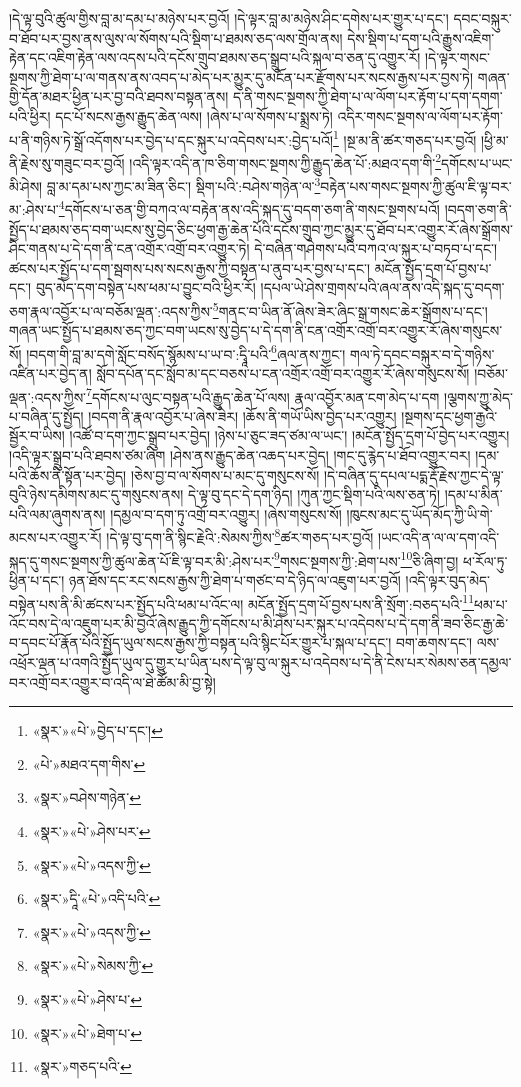 །དེ་ལྟ་བུའི་ཚུལ་གྱིས་བླ་མ་དམ་པ་མཉེས་པར་བྱའོ། །དེ་ལྟར་བླ་མ་མཉེས་ཤིང་དགེས་པར་གྱུར་པ་དང་། དབང་བསྐུར་བ་ཐོབ་པར་བྱས་ནས་ལུས་ལ་སོགས་པའི་སྡིག་པ་ཐམས་ཅད་ལས་གྲོལ་ནས། དེས་སྡིག་པ་དག་པའི་རྒྱུས་འཇིག་རྟེན་དང་འཇིག་རྟེན་ལས་འདས་པའི་དངོས་གྲུབ་ཐམས་ཅད་སྒྲུབ་པའི་སྐལ་བ་ཅན་དུ་འགྱུར་རོ། །དེ་ལྟར་གསང་སྔགས་ཀྱི་ཐེག་པ་ལ་གནས་ནས་འབད་པ་མེད་པར་མྱུར་དུ་མངོན་པར་རྫོགས་པར་སངས་རྒྱས་པར་བྱས་ཏེ། གཞན་གྱི་དོན་མཐར་ཕྱིན་པར་བྱ་བའི་ཐབས་བསྟན་ནས། ད་ནི་གསང་སྔགས་ཀྱི་ཐེག་པ་ལ་ལོག་པར་རྟོག་པ་དག་དགག་པའི་ཕྱིར། དང་པོ་སངས་རྒྱས་རྒྱུད་ཆེན་ལས། །ཞེས་པ་ལ་སོགས་པ་སྨྲས་ཏེ། འདིར་གསང་སྔགས་ལ་ལོག་པར་རྟོག་པ་ནི་གཉིས་ཏེ་སྒྲོ་འདོགས་པར་བྱེད་པ་དང་སྐུར་པ་འདེབས་པར་:བྱེད་པའོ།\footnote{«སྣར་»«པེ་»བྱེད་པ་དང་།} །སྔ་མ་ནི་ཚར་གཅད་པར་བྱའོ། །ཕྱི་མ་ནི་རྗེས་སུ་གཟུང་བར་བྱའོ། །འདི་ལྟར་འདི་ན་ཁ་ཅིག་གསང་སྔགས་ཀྱི་རྒྱུད་ཆེན་པོ་:མཐའ་དག་གི་\footnote{«པེ་»མཐའ་དག་གིས་}དགོངས་པ་ཡང་མི་ཤེས། བླ་མ་དམ་པས་ཀྱང་མ་ཟིན་ཅིང་། སྡིག་པའི་:བཤེས་གཉེན་ལ་\footnote{«སྣར་»བཤེས་གཉེན་}བརྟེན་པས་གསང་སྔགས་ཀྱི་ཚུལ་ཇི་ལྟ་བར་མ་:ཤེས་པ་\footnote{«སྣར་»«པེ་»ཤེས་པར་}དགོངས་པ་ཅན་གྱི་བཀའ་ལ་བརྟེན་ནས་འདི་སྐད་དུ་བདག་ཅག་ནི་གསང་སྔགས་པའོ། །བདག་ཅག་ནི་སྤྱོད་པ་ཐམས་ཅད་བག་ཡངས་སུ་བྱེད་ཅིང་ཕྱག་རྒྱ་ཆེན་པོའི་དངོས་གྲུབ་ཀྱང་མྱུར་དུ་ཐོབ་པར་འགྱུར་རོ་ཞེས་སྒྲོགས་ཤིང་གནས་པ་དེ་དག་ནི་ངན་འགྲོར་འགྲོ་བར་འགྱུར་ཏེ། དེ་བཞིན་གཤེགས་པའི་བཀའ་ལ་སྐུར་པ་བཏབ་པ་དང་། ཚངས་པར་སྤྱོད་པ་དག་སྦགས་པས་སངས་རྒྱས་ཀྱི་བསྟན་པ་ནུབ་པར་བྱས་པ་དང་། མངོན་སྤྱོད་དྲག་པོ་བྱས་པ་དང་། བུད་མེད་དག་བསྟེན་པས་ཕམ་པ་བྱུང་བའི་ཕྱིར་རོ། །དཔལ་ཡེ་ཤེས་གྲགས་པའི་ཞལ་ནས་འདི་སྐད་དུ་བདག་ཅག་རྣལ་འབྱོར་པ་ལ་བཅོམ་ལྡན་:འདས་ཀྱིས་\footnote{«སྣར་»«པེ་»འདས་ཀྱི་}གནང་བ་ཡིན་ནོ་ཞེས་ཟེར་ཞིང་སྒྲ་གསང་ཆེར་སྒྲོགས་པ་དང་། གཞན་ཡང་སྤྱོད་པ་ཐམས་ཅད་ཀྱང་བག་ཡངས་སུ་བྱེད་པ་དེ་དག་ནི་ངན་འགྲོར་འགྲོ་བར་འགྱུར་རོ་ཞེས་གསུངས་སོ། །བདག་གི་བླ་མ་དགེ་སློང་བསོད་སྙོམས་པ་ཡ་བ་:དྭཱི་པའི་\footnote{«སྣར་»དཱི་«པེ་»འདི་པའི་}ཞལ་ནས་ཀྱང་། གལ་ཏེ་དབང་བསྐུར་བ་དེ་གཉིས་འཛིན་པར་བྱེད་ན། སློབ་དཔོན་དང་སློབ་མ་དང་བཅས་པ་ངན་འགྲོར་འགྲོ་བར་འགྱུར་རོ་ཞེས་གསུངས་སོ། །བཅོམ་ལྡན་:འདས་ཀྱིས་\footnote{«སྣར་»«པེ་»འདས་ཀྱི་}དགོངས་པ་ལུང་བསྟན་པའི་རྒྱུད་ཆེན་པོ་ལས། རྣལ་འབྱོར་མན་ངག་མེད་པ་དག །ལྕགས་ཀྱུ་མེད་པ་བཞིན་དུ་སྤྱོད། །བདག་ནི་རྣལ་འབྱོར་པ་ཞེས་ཟེར། །ཆོས་ནི་གཡོ་ཡིས་བྱེད་པར་འགྱུར། །སྔགས་དང་ཕྱག་རྒྱའི་སྦྱོར་བ་ཡིས། །འཚོ་བ་དག་ཀྱང་སྒྲུབ་པར་བྱེད། །ཉེས་པ་ཅུང་ཟད་ཙམ་ལ་ཡང་། །མངོན་སྤྱོད་དྲག་པོ་བྱེད་པར་འགྱུར། །འདི་ལྟར་སྒྲུབ་པའི་ཐབས་ཙམ་ཞིག །ཤེས་ནས་རྒྱུད་ཆེན་འཆད་པར་བྱེད། །གང་དུ་རྙེད་པ་ཐོབ་འགྱུར་བར། །དམ་པའི་ཆོས་ནི་སྟོན་པར་བྱེད། །ཅེས་བྱ་བ་ལ་སོགས་པ་མང་དུ་གསུངས་སོ། །དེ་བཞིན་དུ་དཔལ་པདྨ་རྡོ་རྗེས་ཀྱང་དེ་ལྟ་བུའི་ཉེས་དམིགས་མང་དུ་གསུངས་ནས། དེ་ལྟ་བུ་དང་དེ་དག་ཉིད། །ཀུན་ཀྱང་སྡིག་པའི་ལས་ཅན་ཏེ། །དམ་པ་མིན་པའི་ལམ་ཞུགས་ནས། །དམྱལ་བ་དག་ཏུ་འགྲོ་བར་འགྱུར། །ཞེས་གསུངས་སོ། །ཁུངས་མང་དུ་ཡོད་མོད་ཀྱི་ཡི་གེ་མངས་པར་འགྱུར་རོ། །དེ་ལྟ་བུ་དག་ནི་སྙིང་རྗེའི་:སེམས་ཀྱིས་\footnote{«སྣར་»«པེ་»སེམས་ཀྱི་}ཚར་གཅད་པར་བྱའོ། །ཡང་འདི་ན་ལ་ལ་དག་འདི་སྐད་དུ་གསང་སྔགས་ཀྱི་ཚུལ་ཆེན་པོ་ཇི་ལྟ་བར་མི་:ཤེས་པར་\footnote{«སྣར་»«པེ་»ཤེས་པ་}གསང་སྔགས་ཀྱི་:ཐེག་པས་\footnote{«སྣར་»«པེ་»ཐེག་པ་}ཅི་ཞིག་བྱ། ཕ་རོལ་ཏུ་ཕྱིན་པ་དང་། ཉན་ཐོས་དང་རང་སངས་རྒྱས་ཀྱི་ཐེག་པ་གཙང་བ་དེ་ཉིད་ལ་འཇུག་པར་བྱའོ། །འདི་ལྟར་བུད་མེད་བསྟེན་པས་ནི་མི་ཚངས་པར་སྤྱོད་པའི་ཕམ་པ་འོང་ལ། མངོན་སྤྱོད་དྲག་པོ་བྱས་པས་ནི་སྲོག་:བཅད་པའི་\footnote{«སྣར་»གཅད་པའི་}ཕམ་པ་འོང་བས་དེ་ལ་འཇུག་པར་མི་བྱའོ་ཞེས་རྒྱུད་ཀྱི་དགོངས་པ་མི་ཤེས་པར་སྐུར་པ་འདེབས་པ་དེ་དག་ནི་ཟབ་ཅིང་རྒྱ་ཆེ་བ་དབང་པོ་རྣོན་པོའི་སྤྱོད་ཡུལ་སངས་རྒྱས་ཀྱི་བསྟན་པའི་སྙིང་པོར་གྱུར་པ་སྐལ་པ་དང་། བག་ཆགས་དང་། ལས་འཕྲོར་ལྡན་པ་འགའི་སྤྱོད་ཡུལ་དུ་གྱུར་པ་ཡིན་པས་དེ་ལྟ་བུ་ལ་སྐུར་པ་འདེབས་པ་དེ་ནི་ངེས་པར་སེམས་ཅན་དམྱལ་བར་འགྲོ་བར་འགྱུར་བ་འདི་ལ་ཐེ་ཚོམ་མི་བྱ་སྟེ། 